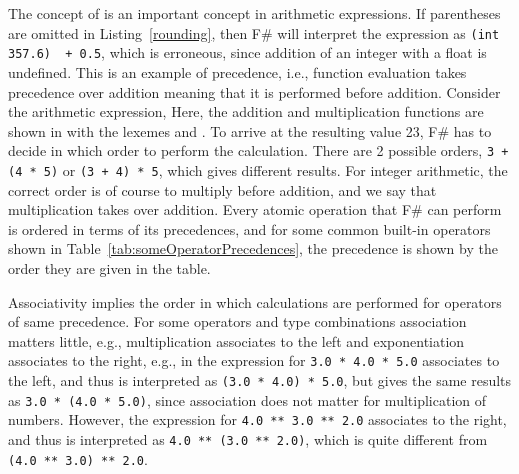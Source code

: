 The concept of  is an important concept in arithmetic expressions. If parentheses are omitted in Listing~\ref{rounding}, then F\# will interpret the expression as \lstinline|(int 357.6)  + 0.5|, which is erroneous, since addition of an integer with a float is undefined. This is an example of precedence, i.e., function evaluation takes precedence over addition meaning that it is performed before addition. Consider the arithmetic expression,
%
%
Here, the addition and multiplication functions are shown in  with the  lexemes \lexeme{+} and \lexeme{*}. To arrive at the resulting value 23, F\# has to decide in which order to perform the calculation. There are 2 possible orders, \lstinline|3 + (4 * 5)| or \lstinline|(3 + 4) * 5|, which gives different results. For integer arithmetic, the correct order is of course to multiply before addition, and we say that multiplication takes  over addition. Every atomic operation that F\# can perform is ordered in terms of its precedences, and for some common built-in operators shown in Table~\ref{tab:someOperatorPrecedences}, the precedence is shown by the order they are given in the table.

Associativity implies the order in which calculations are performed for operators of same precedence. For some operators and type combinations association matters little, e.g., multiplication associates to the left and exponentiation associates to the right, e.g., in
%
%
the expression for \lstinline|3.0 * 4.0 * 5.0| associates to the left, and thus is interpreted as \mbox{\lstinline|(3.0 * 4.0) * 5.0|,} but gives the same results as \lstinline|3.0 * (4.0 * 5.0)|, since association does not matter for multiplication of numbers. However, the expression for \lstinline|4.0 ** 3.0 ** 2.0| associates to the right, and thus is interpreted as \lstinline|4.0 ** (3.0 ** 2.0)|, which is quite different from \lstinline|(4.0 ** 3.0) ** 2.0|. 

